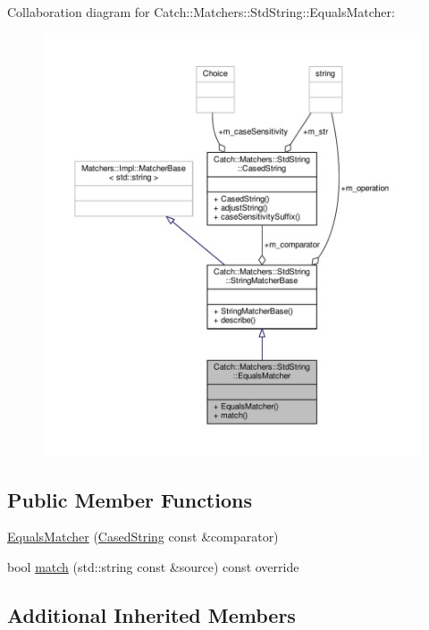 Collaboration diagram for Catch\-:\-:Matchers\-:\-:Std\-String\-:\-:Equals\-Matcher\-:
\nopagebreak
\begin{figure}[H]
\begin{center}
\leavevmode
\includegraphics[width=350pt]{struct_catch_1_1_matchers_1_1_std_string_1_1_equals_matcher__coll__graph}
\end{center}
\end{figure}
\subsection*{Public Member Functions}
\begin{DoxyCompactItemize}
\item 
\hyperlink{struct_catch_1_1_matchers_1_1_std_string_1_1_equals_matcher_ab740f1fb2310e9fe3fed5134d4c7e4c8}{Equals\-Matcher} (\hyperlink{struct_catch_1_1_matchers_1_1_std_string_1_1_cased_string}{Cased\-String} const \&comparator)
\item 
bool \hyperlink{struct_catch_1_1_matchers_1_1_std_string_1_1_equals_matcher_a0bb9d64693f7bb1ef7441062d219f21a}{match} (std\-::string const \&source) const override
\end{DoxyCompactItemize}
\subsection*{Additional Inherited Members}


